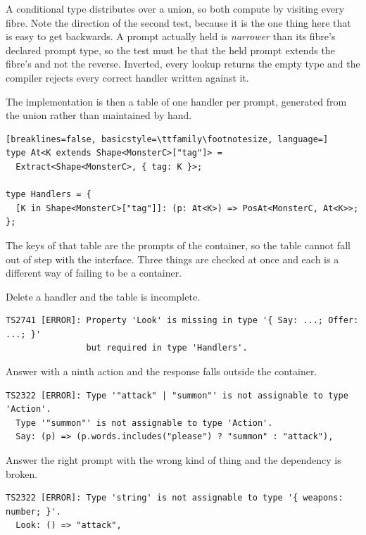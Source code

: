 \documentclass[11pt,a4paper]{article}
\begin{document}
A conditional type distributes over a union, so both compute by visiting every fibre. Note the
direction of the second test, because it is the one thing here that is easy to get backwards. A
prompt actually held is \emph{narrower} than its fibre's declared prompt type, so the test must be
that the held prompt extends the fibre's and not the reverse. Inverted, every lookup returns the
empty type and the compiler rejects every correct handler written against it.

The implementation is then a table of one handler per prompt, generated from the union rather than
maintained by hand.

\begin{lstlisting}[breaklines=false, basicstyle=\ttfamily\footnotesize, language=]
type At<K extends Shape<MonsterC>["tag"]> =
  Extract<Shape<MonsterC>, { tag: K }>;

type Handlers = {
  [K in Shape<MonsterC>["tag"]]: (p: At<K>) => PosAt<MonsterC, At<K>>;
};
\end{lstlisting}

The keys of that table are the prompts of the container, so the table cannot fall out of step with
the interface. Three things are checked at once and each is a different way of failing to be a
container.

Delete a handler and the table is incomplete.

\begin{lstlisting}[breaklines=false, basicstyle=\ttfamily\footnotesize]
TS2741 [ERROR]: Property 'Look' is missing in type '{ Say: ...; Offer: ...; }'
                but required in type 'Handlers'.
\end{lstlisting}

Answer with a ninth action and the response falls outside the container.

\begin{lstlisting}[breaklines=false, basicstyle=\ttfamily\footnotesize]
TS2322 [ERROR]: Type '"attack" | "summon"' is not assignable to type 'Action'.
  Type '"summon"' is not assignable to type 'Action'.
  Say: (p) => (p.words.includes("please") ? "summon" : "attack"),
\end{lstlisting}

Answer the right prompt with the wrong kind of thing and the dependency is broken.

\begin{lstlisting}[breaklines=false, basicstyle=\ttfamily\footnotesize]
TS2322 [ERROR]: Type 'string' is not assignable to type '{ weapons: number; }'.
  Look: () => "attack",
\end{lstlisting}
\end{document}
